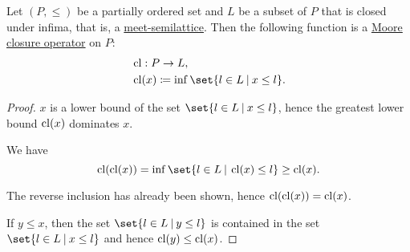 \begin{proposition}\label{thm:closure_operator_from_semilattice}
  Let \( (P, \leq) \) be a partially ordered set and \( L \) be a subset of \( P \) that is closed under infima, that is, a \hyperref[def:semilattice/meet]{meet-semilattice}. Then the following function is a \hyperref[def:moore_closure_operator]{Moore closure operator} on \( P \):
  \begin{equation*}
    \begin{aligned}
      &\cl: P \to L, \\
      &\cl(x) \coloneqq \inf \set{ l \in L \given x \leq l }. \\
    \end{aligned}
  \end{equation*}
\end{proposition}
\begin{proof}
   \( x \) is a lower bound of the set \( \set{ l \in L \given x \leq l } \), hence the greatest lower bound \( \operatorname{cl}(x) \) dominates \( x \).

   We have
  \begin{equation*}
    \cl(\cl(x)) = \inf \set{ l \in L \given \cl(x) \leq l } \geq \cl(x).
  \end{equation*}

  The reverse inclusion has already been shown, hence \( \operatorname{cl}(\operatorname{cl}(x)) = \operatorname{cl}(x) \).

   If \( y \leq x \), then the set \( \set{ l \in L \given y \leq l } \)
  is contained in the set \( \set{ l \in L \given x \leq l } \) and hence \( \operatorname{cl}(y) \leq \operatorname{cl}(x) \).
\end{proof}


